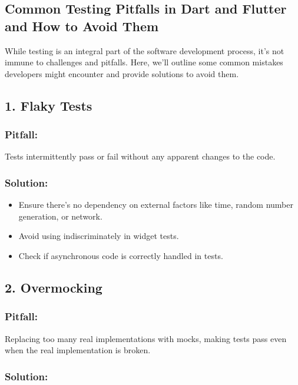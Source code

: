 \subsection{Common Testing Pitfalls in Dart and Flutter and How to Avoid Them}

While testing is an integral part of the software development process, it's not immune to challenges and pitfalls. Here, we'll outline some common mistakes developers might encounter and provide solutions to avoid them.

\subsection*{1. Flaky Tests}

\subsubsection*{Pitfall:}
Tests intermittently pass or fail without any apparent changes to the code.

\subsubsection*{Solution:}

\begin{itemize}
 \item Ensure there's no dependency on external factors like time, random number generation, or network.
 \item Avoid using  indiscriminately in widget tests.
 \item Check if asynchronous code is correctly handled in tests.
\end{itemize}

\subsection*{2. Overmocking}

\subsubsection*{Pitfall:}

Replacing too many real implementations with mocks, making tests pass even when the real implementation is broken.

\subsubsection*{Solution:}

